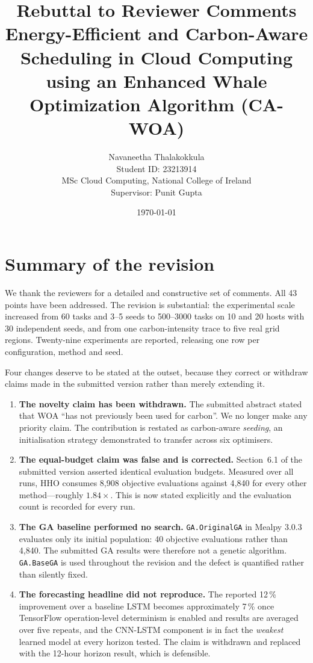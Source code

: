 \documentclass[11pt,a4paper]{article}
\title{\textbf{Rebuttal to Reviewer Comments}\\[4pt]
\large Energy-Efficient and Carbon-Aware Scheduling in Cloud Computing\\
using an Enhanced Whale Optimization Algorithm (CA-WOA)}
\author{Navaneetha Thalakokkula\\Student ID: 23213914\\
MSc Cloud Computing, National College of Ireland\\Supervisor: Punit Gupta}
\date{\today}
\begin{document}
\maketitle

\section*{Summary of the revision}
We thank the reviewers for a detailed and constructive set of comments. All 43
points have been addressed. The revision is substantial: the experimental scale
increased from 60 tasks and 3--5 seeds to 500--3000 tasks on 10 and 20 hosts with
30 independent seeds, and from one carbon-intensity trace to five real grid
regions. Twenty-nine experiments are reported, releasing one row per
configuration, method and seed.

Four changes deserve to be stated at the outset, because they correct or withdraw
claims made in the submitted version rather than merely extending it.

\begin{enumerate}[leftmargin=*]
\item \textbf{The novelty claim has been withdrawn.} The submitted abstract stated
that WOA ``has not previously been used for carbon''. We no longer make any
priority claim. The contribution is restated as carbon-aware \emph{seeding}, an
initialisation strategy demonstrated to transfer across six optimisers.

\item \textbf{The equal-budget claim was false and is corrected.} Section~6.1 of
the submitted version asserted identical evaluation budgets. Measured over all
runs, HHO consumes 8{,}908 objective evaluations against 4{,}840 for every other
method---roughly $1.84\times$. This is now stated explicitly and the evaluation
count is recorded for every run.

\item \textbf{The GA baseline performed no search.} \texttt{GA.OriginalGA} in
Mealpy 3.0.3 evaluates only its initial population: 40 objective evaluations
rather than 4{,}840. The submitted GA results were therefore not a genetic
algorithm. \texttt{GA.BaseGA} is used throughout the revision and the defect is
quantified rather than silently fixed.

\item \textbf{The forecasting headline did not reproduce.} The reported 12\,\%
improvement over a baseline LSTM becomes approximately 7\,\% once TensorFlow
operation-level determinism is enabled and results are averaged over five
repeats, and the CNN-LSTM component is in fact the \emph{weakest} learned model at
every horizon tested. The claim is withdrawn and replaced with the 12-hour
horizon result, which is defensible.
\end{enumerate}
\end{document}
